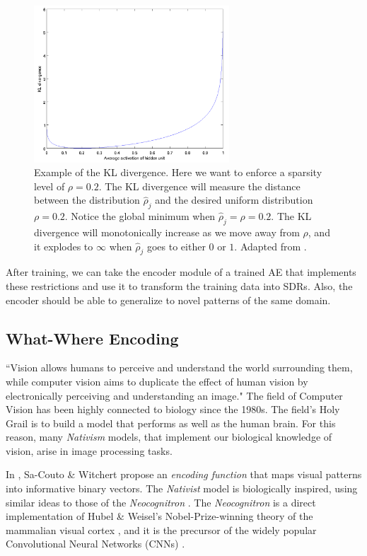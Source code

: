 \documentclass[runningheads]{llncs}
\begin{document}
\begin{figure}[h]
    \centering
    \includegraphics[width=0.65\textwidth]{img/KL.PNG}
    \caption{Example of the KL divergence. Here we want to enforce a sparsity level of $\rho = 0.2$. The KL divergence will measure the distance between the distribution $\hat\rho_j$ and the desired uniform distribution $\rho = 0.2$. Notice the global minimum when $\hat\rho_j = \rho = 0.2 $. The KL divergence will monotonically increase as we move away from $\rho$, and it explodes to $\infty$ when $\hat\rho_j$ goes to either $0$ or $1$. Adapted from \cite{ng2011sparse}.}
\label{fig:KL}
\end{figure}

After training, we can take the encoder module of a trained AE that implements these restrictions and use it to transform the training data into SDRs. Also, the encoder should be able to generalize to novel patterns of the same domain.

\subsection{What-Where Encoding}
\label{sec:prescriptions_WW}
``Vision allows humans to perceive and understand the world surrounding them, while computer vision aims to duplicate the effect of human vision by electronically perceiving and understanding an image." \cite{sonka2014image}
The field of Computer Vision has been highly connected to biology \cite{marr1982vision} since the 1980s. The field's Holy Grail is to build a model that performs as well as the human brain. For this reason, many \textit{Nativism} models, that implement our biological knowledge of vision, arise in image processing tasks.

In \cite{sa2020storing}, Sa-Couto \& Witchert propose an \textit{encoding function} that maps visual patterns into informative binary vectors. The \textit{Nativist} model is biologically inspired, using similar ideas to those of the \textit{Neocognitron} \cite{fukushima1988neocognitron}. The \textit{Neocognitron} is a direct implementation of Hubel \& Weisel's Nobel-Prize-winning theory of the mammalian visual cortex \cite{hubel1962receptive}, and it is the precursor of the widely popular Convolutional Neural Networks (CNNs) \cite{lecun1989backpropagation}.
\end{document}
